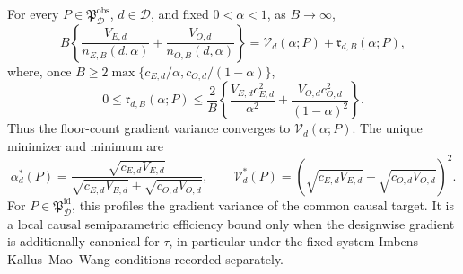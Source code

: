 For every \(P\in\mathfrak P_{\mathcal D}^{\mathrm{obs}}\), \(d\in\mathcal D\), and fixed \(0<\alpha<1\), as \(B\to\infty\),
\[
B\left\{\frac{V_{E,d}}{n_{E,B}(d,\alpha)}+\frac{V_{O,d}}{n_{O,B}(d,\alpha)}\right\}
=\mathcal V_d(\alpha;P)+\mathfrak r_{d,B}(\alpha;P),
\]
where, once \(B\ge2\max\{c_{E,d}/\alpha,c_{O,d}/(1-\alpha)\}\),
\[
0\le\mathfrak r_{d,B}(\alpha;P)\le \frac2B\left\{
\frac{V_{E,d}c_{E,d}^2}{\alpha^2}+
\frac{V_{O,d}c_{O,d}^2}{(1-\alpha)^2}\right\}.
\]
Thus the floor-count gradient variance converges to \(\mathcal V_d(\alpha;P)\). The unique minimizer and minimum are
\[
\alpha_d^*(P)=\frac{\sqrt{c_{E,d}V_{E,d}}}{\sqrt{c_{E,d}V_{E,d}}+\sqrt{c_{O,d}V_{O,d}}},
\qquad
\mathcal V_d^*(P)=\left(\sqrt{c_{E,d}V_{E,d}}+\sqrt{c_{O,d}V_{O,d}}\right)^2.
\]
For \(P\in\mathfrak P_{\mathcal D}^{\mathrm{id}}\), this profiles the gradient variance of the common causal target. It is a local causal semiparametric efficiency bound only when the designwise gradient is additionally canonical for \(\tau\), in particular under the fixed-system Imbens--Kallus--Mao--Wang conditions recorded separately.